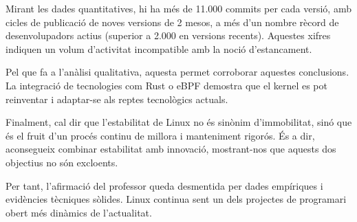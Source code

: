 \documentclass{article}
\begin{document}
Mirant les dades quantitatives, hi ha més de 11.000 commits per cada versió, amb cicles de publicació de noves versions de 2 mesos, a més d'un nombre rècord de desenvolupadors actius (superior a 2.000 en versions recents). Aquestes xifres indiquen un volum d'activitat incompatible amb la noció d'estancament.

Pel que fa a l'anàlisi qualitativa, aquesta permet corroborar aquestes conclusions. La integració de tecnologies com Rust o eBPF demostra que el kernel es pot reinventar i adaptar-se als reptes tecnològics actuals.

Finalment, cal dir que l'estabilitat de Linux no és sinònim d'immobilitat, sinó que és el fruit d'un procés continu de millora i manteniment rigorós. És a dir, aconsegueix combinar estabilitat amb innovació, mostrant-nos que aquests dos objectius no són excloents.

Per tant, l'afirmació del professor queda desmentida per dades empíriques i evidències tècniques sòlides. Linux continua sent un dels projectes de programari obert més dinàmics de l'actualitat.

\newpage 



\end{document}
